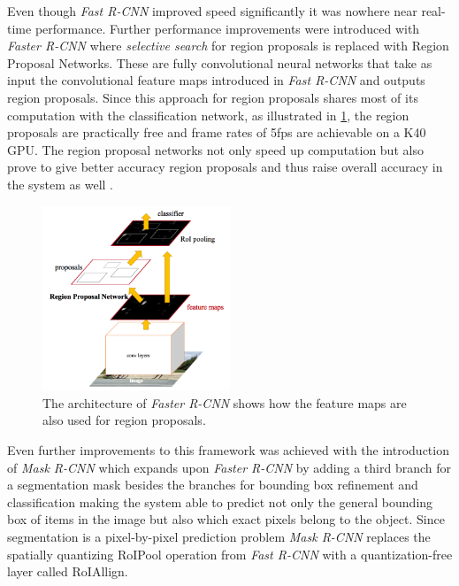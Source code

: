 \documentclass{kththesis}
\newcommand{\bibentry}[1]{\parencite{#1}}
\begin{document}
Even though
\emph{Fast R-CNN} improved speed significantly it was nowhere near real-time
performance. Further performance improvements were introduced with \emph{Faster
  R-CNN} \bibentry{ren2015faster} where \emph{selective search} for region
proposals is replaced with Region Proposal Networks. These are fully convolutional neural
networks that take as input the convolutional feature maps introduced in 
\emph{Fast R-CNN}\parencite{girshick2015fast} and outputs region proposals. Since this approach for region
proposals shares most of its computation with the classification network, as illustrated in \cref{fig:FasterR-CNN}, the
region proposals are practically free and frame rates of 5fps are achievable on
a K40 GPU.
The region proposal networks not only speed up computation but also prove to
give better accuracy region proposals and thus raise overall accuracy in the
system as well \bibentry{ren2015faster}.

\begin{figure}[h]
  \centering
  \includegraphics[width=0.5\textwidth]{FasterR-CNN}
  \caption{The architecture of \textit{Faster R-CNN} shows how the feature maps
    are also used for region proposals.}
  \label{fig:FasterR-CNN}
  \end{figure}

Even further improvements to this
framework was achieved with the introduction of \emph{Mask R-CNN}
\bibentry{he2017mask} which expands upon \emph{Faster R-CNN} by adding a third
branch for a segmentation mask besides the branches for bounding box refinement
and classification making the system able to predict not only the general
bounding box of items in the image but also which exact pixels belong to the
object. Since segmentation is a pixel-by-pixel prediction problem \emph{Mask
  R-CNN} replaces the spatially quantizing RoIPool operation from \emph{Fast
  R-CNN} with a quantization-free layer called RoIAllign. 
\end{document}

